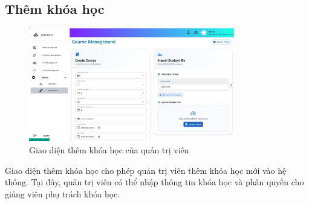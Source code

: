 \subsection{Thêm khóa học}
\begin{figure}[H]
    \centering
    \includegraphics[width=0.8\textwidth]{images/CapScreen_Admin/addcourse.png}
    \caption{Giao diện thêm khóa học của quản trị viên}
    \label{fig:admin_add_course_page}
\end{figure}
Giao diện thêm khóa học cho phép quản trị viên thêm khóa học mới vào hệ thống. Tại đây, quản trị viên có thể nhập thông tin khóa học và phân quyền cho giảng viên phụ trách khóa học. 
